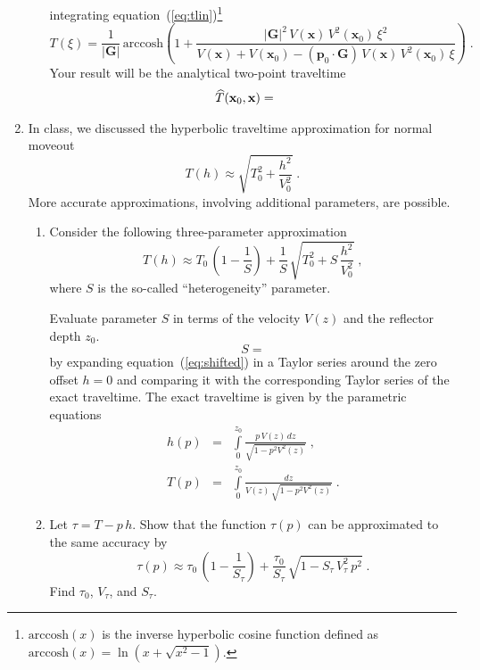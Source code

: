 \begin{enumerate}
\begin{enumerate}
  integrating equation~(\ref{eq:tlin})\footnote{$\mbox{arccosh}(x)$ is
  the inverse hyperbolic cosine function defined as $\mbox{arccosh}(x)
  = \ln\left(x + \sqrt{x^2-1}\right)$.}  
  \begin{equation}
  \label{eq:t1} T(\xi) =
  \frac{1}{|\mathbf{G}|}\,\mbox{arccosh}\left(1 +
  \frac{|\mathbf{G}|^2\,V(\mathbf{x})\,V^2(\mathbf{x}_0)\,\xi^2}
  {V(\mathbf{x})+V(\mathbf{x}_0) - (\mathbf{p}_0 \cdot
  \mathbf{G})\,V(\mathbf{x})\,V^2(\mathbf{x}_0)\,\xi}\right)\;.
  \end{equation} 
  Your result will be the analytical two-point
  traveltime 
  \begin{eqnarray} 
  \label{eq:t2}
    \widehat{T}(\mathbf{x}_0,\mathbf{x}) = & & \hfill \ 
  \end{eqnarray}
\end{enumerate}

\item In class, we discussed the hyperbolic traveltime approximation for normal moveout
  \begin{equation}
  \label{eq:hyper2}
  T(h) \approx \sqrt{T_0^2 + \frac{h^2}{V_0^2}}\;.
\end{equation}
More accurate approximations, involving additional parameters, are possible.
\begin{enumerate}
\item Consider the following three-parameter approximation
  \begin{equation}
    \label{eq:shifted}
    T(h) \approx T_0\,\left(1-\frac{1}{S}\right) + 
\frac{1}{S}\,\sqrt{T_0^2+S\,\frac{h^2}{V_0^2}}\;,
  \end{equation}
  where $S$ is the so-called ``heterogeneity'' parameter. 

Evaluate parameter $S$ in terms of the velocity $V(z)$ and the reflector depth $z_0$.
\begin{equation}
  \label{eq:a}
  S =
\end{equation}
by expanding
  equation~(\ref{eq:shifted}) in a Taylor series around the zero offset
  $h=0$ and comparing it with the corresponding Taylor series of the exact
  traveltime. The exact traveltime is given by the parametric equations
  \begin{eqnarray}
\label{eq:xofp}
h(p) & = & \int\limits_0^{z_0} \frac{p\,V(z)\,dz}{\sqrt{1-p^2 V^2(z)}}\;, \\
\label{eq:tofp}
T(p) & = & \int\limits_0^{z_0} \frac{dz}{V(z)\,\sqrt{1-p^2 V^2(z)}}\;.
\end{eqnarray}
\item Let $\tau = T-p\,h$. Show that the function $\tau(p)$ can be approximated to the same accuracy by
\begin{equation}
    \label{eq:tauofp}
    \tau(p) \approx \displaystyle \tau_0\,\left(1-\frac{1}{S_{\tau}}\right) + 
\frac{\tau_0}{S_{\tau}}\,\sqrt{1-S_{\tau}\,{V_{\tau}^2}\,p^2}\;.
  \end{equation}
Find $\tau_0$, $V_{\tau}$, and $S_{\tau}$.
\end{enumerate}
\end{enumerate}

